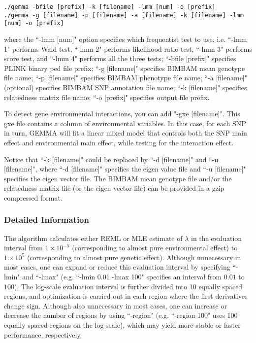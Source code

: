 \documentclass[11pt]{article}
\begin{document}
\begin{verbatim}
./gemma -bfile [prefix] -k [filename] -lmm [num] -o [prefix]
./gemma -g [filename] -p [filename] -a [filename] -k [filename] -lmm [num] -o [prefix]
\end{verbatim}

where the ``-lmm [num]" option specifies which frequentist test to
use, i.e. ``-lmm 1" performs Wald test, ``-lmm 2" performs likelihood
ratio test, ``-lmm 3" performs score test, and ``-lmm 4" performs all
the three tests; ``-bfile [prefix]" specifies PLINK binary ped file
prefix; ``-g [filename]" specifies BIMBAM mean genotype file name;
``-p [filename]" specifies BIMBAM phenotype file name; ``-a
[filename]" (optional) specifies BIMBAM SNP annotation file name; ``-k
[filename]" specifies relatedness matrix file name; ``-o [prefix]"
specifies output file prefix.

To detect gene environmental interactions, you can add "-gxe
[filename]". This gxe file contains a column of environmental
variables. In this case, for each SNP in turn, GEMMA will fit a linear
mixed model that controls both the SNP main effect and environmental
main effect, while testing for the interaction effect.

Notice that ``-k [filename]" could be replaced by ``-d [filename]" and
``-u [filename]", where ``-d [filename]" specifies the eigen value
file and ``-u [filename]" specifies the eigen vector file. The BIMBAM
mean genotype file and/or the relatedness matrix file (or the eigen
vector file) can be provided in a gzip compressed format.

\subsubsection{Detailed Information}

The algorithm calculates either REML or MLE estimate of $\lambda$ in
the evaluation interval from $1\times 10^{-5}$ (corresponding to
almost pure environmental effect) to $1\times 10^5$ (corresponding to
almost pure genetic effect). Although unnecessary in most cases, one
can expand or reduce this evaluation interval by specifying ``-lmin"
and ``-lmax" (e.g. ``-lmin 0.01 -lmax 100" specifies an interval from
$0.01$ to $100$). The log-scale evaluation interval is further divided
into 10 equally spaced regions, and optimization is carried out in
each region where the first derivatives change sign. Although also
unnecessary in most cases, one can increase or decrease the number of
regions by using ``-region" (e.g. ``-region 100" uses 100 equally
spaced regions on the log-scale), which may yield more stable or
faster performance, respectively.
\end{document}
